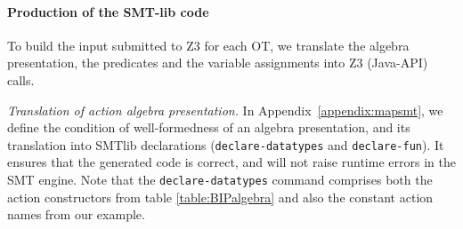 \documentclass{lncs/llncs}
\newcommand{\noteSB}[2][color=green!40, size=\tiny]{\todo[#1]{{\bf
      Note: } {#2}}}
\newcommand{\TODO}[1]{\textcolor{red}{\textbf{[TODO:#1]}}}
\begin{document}
\paragraph{Production of the SMT-lib code}
  To build the input submitted to Z3 for each OT,
we translate the algebra presentation, the predicates and the
variable assignments into Z3 (Java-API) calls.

\emph{Translation of action algebra presentation.}
In Appendix~\ref{appendix:mapsmt}, we  define the condition of
well-formedness of an algebra presentation, and its translation into
SMTlib declarations (\texttt{declare-datatypes} and
\texttt{declare-fun}). It ensures that the generated code is correct,
and will not raise runtime errors in the SMT engine. Note that the
\texttt{declare-datatypes} command comprises both the action
constructors from table \ref{table:BIPalgebra} and also the constant action
names from our example.



\end{document}
